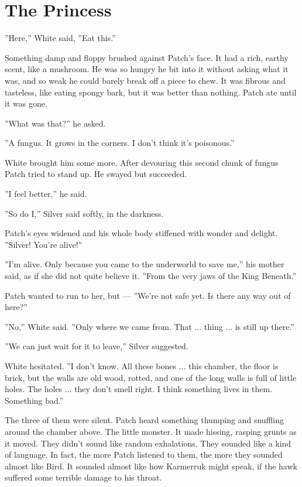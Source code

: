 \documentclass[12pt]{book}
\begin{document}

\section{The Princess}

''Here,'' White said, ''Eat this.''

Something damp and floppy brushed against Patch's face. It had a rich, earthy scent, like a mushroom. He was so hungry he bit into it without asking what it was, and so weak he could barely break off a piece to chew. It was fibrous and tasteless, like eating spongy bark, but it was better than nothing. Patch ate until it was gone.

''What was that?'' he asked.

''A fungus. It grows in the corners. I don't think it's poisonous.''

White brought him some more. After devouring this second chunk of fungus Patch tried to stand up. He swayed but succeeded.

''I feel better,'' he said.

''So do I,'' Silver said softly, in the darkness.

Patch's eyes widened and his whole body stiffened with wonder and delight. ''Silver! You're alive!''

''I'm alive. Only because you came to the underworld to save me,'' his mother said, as if she did not quite believe it. ''From the very jaws of the King Beneath.''

Patch wanted to run to her, but ---
''We're not safe yet. Is there any way out of here?''

''No,'' White said. ''Only where we came from. That ... thing ... is still up there.''

''We can just wait for it to leave,'' Silver suggested.

White hesitated. ''I don't know. All these bones ... this chamber, the floor is brick, but the walls are old wood, rotted, and one of the long walls is full of little holes. The holes ... they don't smell right. I think something lives in them. Something bad.''

The three of them were silent. Patch heard something thumping and snuffling around the chamber above. The little monster. It made hissing, rasping grunts as it moved. They didn't sound like random exhalations. They sounded like a kind of language. In fact, the more Patch listened to them, the more they sounded almost like Bird. It sounded almost like how Karmerruk might speak, if the hawk suffered some terrible damage to his throat.
\end{document}
